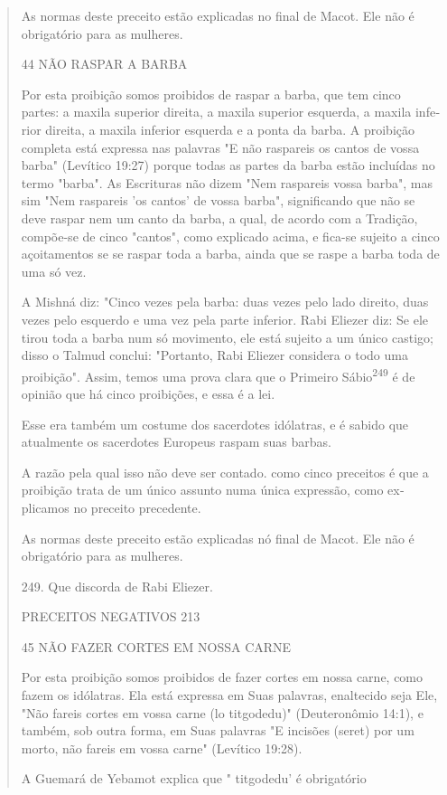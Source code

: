 \begin{quote}
As normas deste preceito estão explicadas no final de Macot. Ele não é
obrigatório para as mulheres.

44 NÃO RASPAR A BARBA

Por esta proibição somos proibidos de raspar a barba, que tem cin­co
partes: a maxila superior direita, a maxila superior esquerda, a maxila
infe­rior direita, a maxila inferior esquerda e a ponta da barba. A
proibição comple­ta está expressa nas palavras "E não raspareis os
cantos de vossa barba" (Levíti­co 19:27) porque todas as partes da barba
estão incluídas no termo "barba". As Escrituras não dizem "Nem raspareis
vossa barba", mas sim "Nem raspareis 'os cantos' de vossa barba",
significando que não se deve raspar nem um canto da barba, a qual, de
acordo com a Tradição, compõe-se de cinco "cantos", co­mo explicado
acima, e fica-se sujeito a cinco açoitamentos se se raspar toda a barba,
ainda que se raspe a barba toda de uma só vez.

A Mishná diz: "Cinco vezes pela barba: duas vezes pelo lado direito,
duas vezes pelo esquerdo e uma vez pela parte inferior. Rabi Eliezer
diz: Se ele tirou toda a barba num só movimento, ele está sujeito a um
único castigo; disso o Talmud conclui: "Portanto, Rabi Eliezer considera
o todo uma proibição". Assim, temos uma prova clara que o Primeiro
Sábio\textsuperscript{249} é de opinião que há cin­co proibições, e essa
é a lei.

Esse era também um costume dos sacerdotes idólatras, e é sabido que
atualmente os sacerdotes Europeus raspam suas barbas.

A razão pela qual isso não deve ser contado. como cinco preceitos é que
a proibição trata de um único assunto numa única expressão, como
ex­plicamos no preceito precedente.

As normas deste preceito estão explicadas nó final de Macot. Ele não é
obrigatório para as mulheres.

249. Que discorda de Rabi Eliezer.

PRECEITOS NEGATIVOS 213

45 NÃO FAZER CORTES EM NOSSA CARNE

Por esta proibição somos proibidos de fazer cortes em nossa carne, como
fazem os idólatras. Ela está expressa em Suas palavras, enaltecido seja
Ele, "Não fareis cortes em vossa carne (lo titgodedu)" (Deuteronômio
14:1), e tam­bém, sob outra forma, em Suas palavras "E incisões (seret)
por um morto, não fareis em vossa carne" (Levítico 19:28).

A Guemará de Yebamot explica que " titgodedu' é obrigatório


\end{quote}

